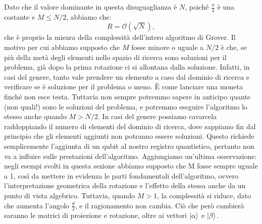 \documentclass{book}
\theoremstyle{definition}
\theoremstyle{definition}
\theoremstyle{definition}
\theoremstyle{plain}
\theoremstyle{plain}
\theoremstyle{plain}
\theoremstyle{plain}
\begin{document}
Dato che il valore dominante in questa disuguaglianza è $N$, poiché $\frac{\pi}{4}$ è una costante e $M \leq N/2$, abbiamo che:
\begin{displaymath}
R = \mathcal{O}(\sqrt{N}),
\end{displaymath}
che è proprio la misura della complessità dell'intero algoritmo di Grover. Il motivo per cui abbiamo supposto che $M$ fosse minore o uguale a $N/2$ è che, se più della metà degli elementi nello spazio di ricerca sono soluzioni per il problema, già dopo la prima rotazione ci si allontana dalla soluzione. Infatti, in casi del genere, tanto vale prendere un elemento a caso dal dominio di ricerca e verificare se è soluzione per il problema o meno. È come lanciare una moneta finché non esce testa. Tuttavia non sempre potremmo sapere in anticipo quante (non quali!) sono le soluzioni del problema, e potremmo eseguire l'algoritmo lo stesso anche quando $M > N/2$. In casi del genere possiamo cavarcela raddoppiando il numero di elementi del dominio di ricerca, dove sappiamo fin dal principio che gli elementi aggiunti non potranno essere soluzioni. Questo richiede semplicemente l'aggiunta di un qubit al nostro registro quantistico, pertanto non va a influire sulle prestazioni dell'algoritmo.
Aggiungiamo un'ultima osservazione: negli esempi svolti in questa sezione abbiamo supposto che M fosse sempre uguale a 1, così da mettere in evidenza le parti fondamentali dell'algoritmo, ovvero l'interpretazione geometrica della rotazione e l'effetto della stessa anche da un punto di vista algebrico. Tuttavia, quando $M > 1$, la complessità si riduce, dato che aumenta l'angolo $\frac{\theta}{2}$, e il ragionamento non cambia. Ciò che però cambierà saranno le matrici di proiezione e rotazione, oltre ai vettori $\ket{\alpha}$ e $\ket{\beta}$.
\end{document}
